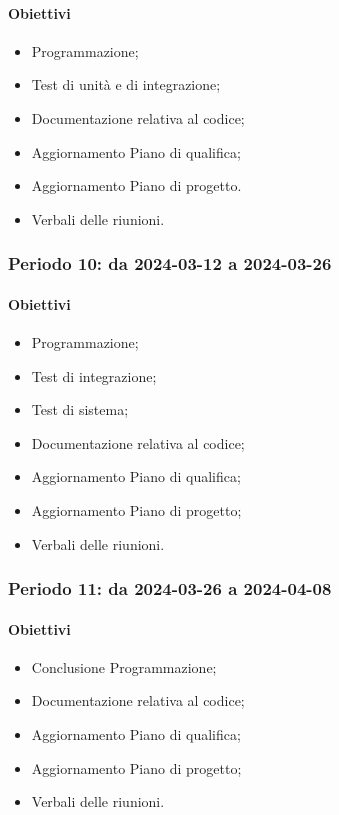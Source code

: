 \documentclass[10pt, a4paper]{article}
\begin{document}
{{{{{{{{\paragraph{Obiettivi}
\begin{itemize}
    \item Programmazione;
    \item Test di unità e di integrazione;
    \item Documentazione relativa al codice;
    \item Aggiornamento Piano di qualifica;
    \item Aggiornamento Piano di progetto.
    \item Verbali delle riunioni.
\end{itemize}

\subsubsection{Periodo 10: da 2024-03-12 a 2024-03-26}
\paragraph{Obiettivi}
\begin{itemize}
    \item Programmazione;
    \item Test di integrazione;
    \item Test di sistema;
    \item Documentazione relativa al codice;
    \item Aggiornamento Piano di qualifica;
    \item Aggiornamento Piano di progetto;
    \item Verbali delle riunioni.
\end{itemize}
\subsubsection{Periodo 11: da 2024-03-26 a 2024-04-08}
\paragraph{Obiettivi}
\begin{itemize}
    \item Conclusione Programmazione;
    \item Documentazione relativa al codice;
    \item Aggiornamento Piano di qualifica;
    \item Aggiornamento Piano di progetto;
    \item Verbali delle riunioni.
\end{itemize}


}}}}}}}}
\end{document}
